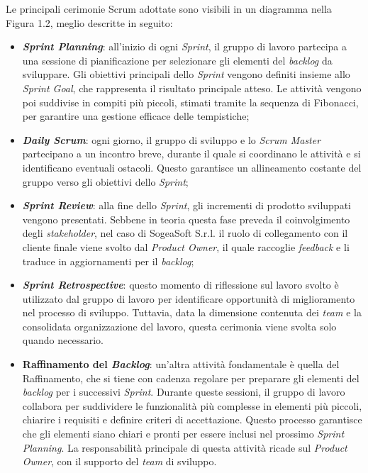     \noindent Le principali cerimonie Scrum adottate sono visibili in un diagramma nella Figura 1.2, meglio descritte in seguito:
    \begin{itemize}
    
        \item \textbf{\textit{Sprint Planning}}: all'inizio di ogni \textit{Sprint}, il gruppo di lavoro partecipa a una sessione di pianificazione per selezionare gli elementi del \textit{backlog} da sviluppare. Gli obiettivi principali dello \textit{Sprint} vengono definiti insieme allo \textit{Sprint Goal}, che rappresenta il risultato principale atteso. Le attività vengono poi suddivise in compiti più piccoli, stimati tramite la sequenza di Fibonacci, per garantire una gestione efficace delle tempistiche;

        \item \textbf{\textit{Daily Scrum}}: ogni giorno, il gruppo di sviluppo e lo \textit{Scrum Master} partecipano a un incontro breve, durante il quale si coordinano le attività e si identificano eventuali ostacoli. Questo garantisce un allineamento costante del gruppo verso gli obiettivi dello \textit{Sprint};

        \item \textbf{\textit{Sprint Review}}: alla fine dello \textit{Sprint}, gli incrementi di prodotto sviluppati vengono presentati. Sebbene in teoria questa fase preveda il coinvolgimento degli \textit{stakeholder}, nel caso di SogeaSoft S.r.l. il ruolo di collegamento con il cliente finale viene svolto dal \textit{Product Owner}, il quale raccoglie \textit{feedback} e li traduce in aggiornamenti per il \textit{backlog};  

        \item \textbf{\textit{Sprint Retrospective}}: questo momento di riflessione sul lavoro svolto è utilizzato dal gruppo di lavoro per identificare opportunità di miglioramento nel processo di sviluppo. Tuttavia, data la dimensione contenuta dei \textit{team} e la consolidata organizzazione del lavoro, questa cerimonia viene svolta solo quando necessario.  

        \item \textbf{Raffinamento del \textit{Backlog}}: un'altra attività fondamentale è quella del Raffinamento, che si tiene con cadenza regolare per preparare gli elementi del \textit{backlog} per i successivi \textit{Sprint}. Durante queste sessioni, il gruppo di lavoro collabora per suddividere le funzionalità più complesse in elementi più piccoli, chiarire i requisiti e definire criteri di accettazione. Questo processo garantisce che gli elementi siano chiari e pronti per essere inclusi nel prossimo \textit{Sprint Planning}. La responsabilità principale di questa attività ricade sul \textit{Product Owner}, con il supporto del \textit{team} di sviluppo.
        
    \end{itemize}
    
